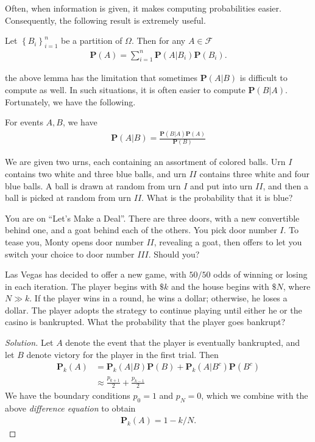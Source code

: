 Often, when information is given, it makes computing probabilities easier.
Consequently, the following result is extremely useful.
\begin{lemma}
	Let $ {\left\{ B_i \right\}}_{i=1}^n$ be a
	partition of $\Omega$. Then
	for any $A \in \mathcal{F}$
	\begin{align*}
		\mathbf{P}(A) = \sum_{i = 1}^n \mathbf{P}(A | B_i) \mathbf{P}(B_i).
	\end{align*}
\end{lemma}
the above lemma has the limitation that sometimes $\mathbf{P}(A |
B)$ is difficult to compute as well. In such situations, 
it is often easier to compute $\mathbf{P}(B | A)$. Fortunately, we have the
following.
\begin{lemma} For events $A, B$, we have
	\begin{align*}
		\mathbf{P}(A | B) = \frac{\mathbf{P}(B | A) \mathbf{P} (A)}{\mathbf{P}(B)}
	\end{align*}
\end{lemma}
\begin{example}
	We are given two urns, each containing an assortment of colored balls.
	Urn $I$ contains two white and three blue balls, and urn $II$ contains
	three white and four blue balls. A ball is drawn at random from urn $I$
	and put into urn $II$, and then a ball is picked at random from urn $II$.
	What is the probability that it is blue?
\end{example}
\begin{example}
	You are on ``Let's Make a Deal''. There are three doors, with a new 
	convertible
	behind one, and a goat behind each of the others. You pick door number $I$.
	To tease you, Monty opens door number $II$, revealing a goat, then offers 
	to let
	you switch your choice to door number $III$. Should you?
\end{example}
\begin{example}
	Las Vegas has decided to offer a new game, with $50/50$ odds
	of winning or losing in each iteration. The player begins with $\$ k$
	and the house begins with $ \$ N$, where $N \gg k$. If the player wins 
	in
	a round, he wins a dollar; otherwise, he loses a dollar. The player adopts 
	the strategy
	to continue playing until either he or the casino is bankrupted.
	What the probability that the player goes bankrupt?
\end{example}
\begin{proof}[Solution]
	Let $A$ denote the event that the player is eventually bankrupted,
	and let $B$ denote victory for the player in the first trial.
	Then
	\begin{align*}
		\mathbf{P}_k(A)
		& = \mathbf{P}_k(A | B) \mathbf{P}(B) + \mathbf{P}_k(A | B^c) \mathbf{P}(B^c)
		\\
		& \approx \frac{p_{k+1}}{2} + \frac{p_{k-1}}{2}
	\end{align*}
	We have the boundary conditions $p_0 = 1$ and $p_N = 0$, which we combine 
	with
	the above \emph{difference equation} to obtain
	\begin{align*}
		\mathbf{P}_k(A) = 1 - k/N.
	\end{align*}
\end{proof}

